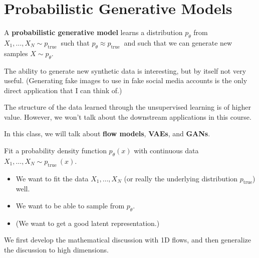 \documentclass{report}
\begin{document}
\section{Probabilistic Generative Models}

\begin{definition}
    A \textbf{probabilistic generative model} learns a distribution $p_{\theta}$ from $X_{1}, \ldots, X_{N} \sim p_{\text {true }}$ such that $p_{\theta} \approx p_{\text {true }}$ and such that we can generate new samples $X \sim p_{\theta}$.

    The ability to generate new synthetic data is interesting, but by itself not very useful.
    (Generating fake images to use in fake social media accounts is the only direct application that I can think of.)

    The structure of the data learned through the unsupervised learning is of higher value. However, we won't talk about the downstream applications in this course.

    In this class, we will talk about \textbf{flow models}, \textbf{VAEs}, and \textbf{GANs}.
\end{definition}

\par\noindent\textcolor{gray}{\hdashrule{\textwidth}{0.4pt}{1pt 2pt}}

Fit a probability density function $p_{\theta}(x)$ with continuous data $X_{1}, \ldots, X_{N} \sim p_{\text {true }}(x)$.

\begin{itemize}
    \item We want to fit the data $X_{1}, \ldots, X_{N}$ (or really the underlying distribution $p_{\text {true}}$) well.
    \item We want to be able to sample from $p_{\theta}$.
    \item (We want to get a good latent representation.)
\end{itemize}

We first develop the mathematical discussion with 1D flows, and then generalize the discussion to high dimensions.
\end{document}
